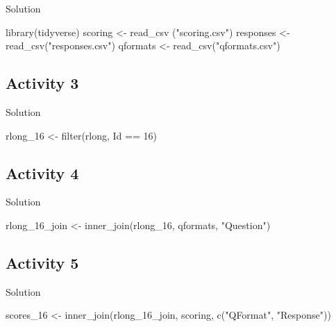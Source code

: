 \documentclass[
  oneside]{book}
\newenvironment{Shaded}{\begin{snugshade}}{\end{snugshade}}
\newcommand{\DecValTok}[1]{\textcolor[rgb]{0.00,0.00,0.81}{#1}}
\newcommand{\FunctionTok}[1]{\textcolor[rgb]{0.00,0.00,0.00}{#1}}
\newcommand{\NormalTok}[1]{#1}
\newcommand{\OtherTok}[1]{\textcolor[rgb]{0.56,0.35,0.01}{#1}}
\newcommand{\SpecialCharTok}[1]{\textcolor[rgb]{0.00,0.00,0.00}{#1}}
\newcommand{\StringTok}[1]{\textcolor[rgb]{0.31,0.60,0.02}{#1}}
\begin{document}
Solution

\begin{Shaded}
\begin{Highlighting}[]
\FunctionTok{library}\NormalTok{(tidyverse)}
\NormalTok{scoring }\OtherTok{\textless{}{-}} \FunctionTok{read\_csv}\NormalTok{ (}\StringTok{"scoring.csv"}\NormalTok{)}
\NormalTok{responses }\OtherTok{\textless{}{-}} \FunctionTok{read\_csv}\NormalTok{(}\StringTok{"responses.csv"}\NormalTok{)}
\NormalTok{qformats }\OtherTok{\textless{}{-}} \FunctionTok{read\_csv}\NormalTok{(}\StringTok{"qformats.csv"}\NormalTok{)}
\end{Highlighting}
\end{Shaded}

\hypertarget{activity-3-2}{%
\subsection{Activity 3}\label{activity-3-2}}

Solution

\begin{Shaded}
\begin{Highlighting}[]
\NormalTok{rlong\_16 }\OtherTok{\textless{}{-}} \FunctionTok{filter}\NormalTok{(rlong, Id }\SpecialCharTok{==} \DecValTok{16}\NormalTok{)}
\end{Highlighting}
\end{Shaded}

\hypertarget{activity-4-2}{%
\subsection{Activity 4}\label{activity-4-2}}

Solution

\begin{Shaded}
\begin{Highlighting}[]
\NormalTok{rlong\_16\_join }\OtherTok{\textless{}{-}} \FunctionTok{inner\_join}\NormalTok{(rlong\_16, qformats, }\StringTok{"Question"}\NormalTok{)}
\end{Highlighting}
\end{Shaded}

\hypertarget{activity-5-1}{%
\subsection{Activity 5}\label{activity-5-1}}

Solution

\begin{Shaded}
\begin{Highlighting}[]
\NormalTok{scores\_16 }\OtherTok{\textless{}{-}} \FunctionTok{inner\_join}\NormalTok{(rlong\_16\_join, scoring, }\FunctionTok{c}\NormalTok{(}\StringTok{"QFormat"}\NormalTok{, }\StringTok{"Response"}\NormalTok{))}
\end{Highlighting}
\end{Shaded}
\end{document}
